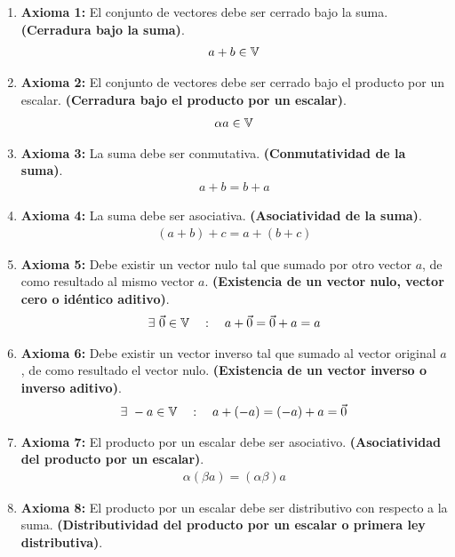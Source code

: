 \begin{enumerate}
    \item \textbf{Axioma 1:} El conjunto de vectores debe ser cerrado bajo la suma. \textbf{(Cerradura bajo la suma)}. \begin{align}
        a + b \in \mathbb{V}
    \end{align}
    \item \textbf{Axioma 2:} El conjunto de vectores debe ser cerrado bajo el producto por un escalar. \textbf{(Cerradura bajo el producto por un escalar)}. \begin{align}
        \alpha a \in \mathbb{V}
    \end{align}
    \item \textbf{Axioma 3:} La suma debe ser conmutativa. \textbf{(Conmutatividad de la suma)}. \begin{align}
        a + b = b + a
    \end{align}
    \item \textbf{Axioma 4:} La suma debe ser asociativa. \textbf{(Asociatividad de la suma)}. \begin{align}
        (a + b) + c = a + (b + c)
    \end{align}
    \item \textbf{Axioma 5:} Debe existir un vector nulo tal que sumado por otro vector $a$, de como resultado al mismo vector $a$. \textbf{(Existencia de un vector nulo, vector cero o idéntico aditivo)}. \begin{align}
        \exists \ \vec{0} \in \mathbb{V} \quad : \quad a + \vec{0} = \vec{0} + a = a
    \end{align}
    \item \textbf{Axioma 6:} Debe existir un vector inverso tal que sumado al vector original $a$, de como resultado el vector nulo. \textbf{(Existencia de un vector inverso o inverso aditivo)}. \begin{align}
        \exists \ -a \in \mathbb{V} \quad : \quad a + (-a) = (-a) + a = \vec{0}
    \end{align}
    \item \textbf{Axioma 7:} El producto por un escalar debe ser asociativo. \textbf{(Asociatividad del producto por un escalar)}. \begin{align}
        \alpha (\beta a) = (\alpha \beta) a
    \end{align}
    \item \textbf{Axioma 8:} El producto por un escalar debe ser distributivo con respecto a la suma. \textbf{(Distributividad del producto por un escalar o primera ley distributiva)}. \begin{align}

\end{align}
\end{enumerate}
